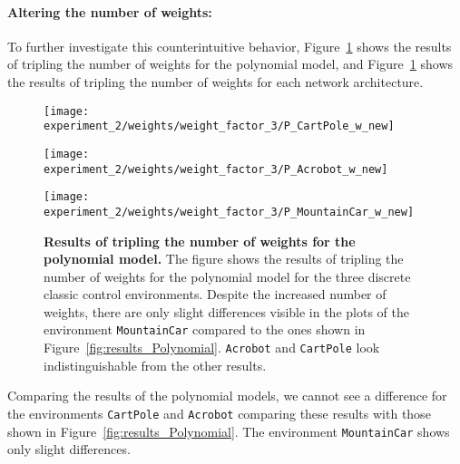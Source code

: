 \paragraph*{Altering the number of weights:} To further investigate this counterintuitive behavior, Figure~\ref{fig:results_NN_weights} shows the results of tripling the number of weights for the polynomial model, and Figure~\ref{fig:results_NN_weights} shows the results of tripling the number of weights for each network architecture.
\begin{figure}[!ht]
  \centering
  \texttt{[image: experiment\_2/weights/weight\_factor\_3/P\_CartPole\_w\_new]}

  \vspace{0.2cm}

  \texttt{[image: experiment\_2/weights/weight\_factor\_3/P\_Acrobot\_w\_new]}

  \vspace{0.2cm}

  \texttt{[image: experiment\_2/weights/weight\_factor\_3/P\_MountainCar\_w\_new]}
\caption[Results of tripling the number of weights for the polynomial model]{
  \textbf{Results of tripling the number of weights for the polynomial model.}
   The figure shows the results of tripling the number of weights for the polynomial model for the three discrete classic control environments. Despite the increased number of weights, there are only slight differences visible in the plots of the environment \texttt{MountainCar} compared to the ones shown in Figure~\ref{fig:results_Polynomial}. \texttt{Acrobot} and \texttt{CartPole} look indistinguishable from the other results.
}
\label{fig:results_NN_weights}
\end{figure}
Comparing the results of the polynomial models, we cannot see a difference for the environments \verb|CartPole| and \verb|Acrobot| comparing these results with those shown in Figure~\ref{fig:results_Polynomial}. The environment \verb|MountainCar| shows only slight differences.

